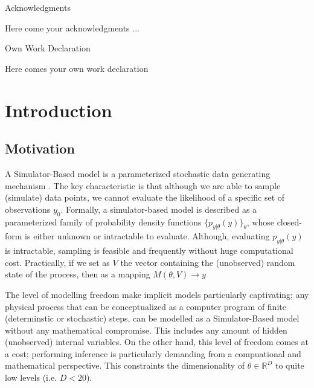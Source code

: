 \documentclass[11pt,twoside]{article}
\numberwithin{Theorem}{section}
\numberwithin{Definition}{section}
\numberwithin{Lemma}{section}
\numberwithin{Algorithm}{section}
\numberwithin{equation}{section}
\begin{document}
\clearpage

\begin{center}
\Large{Acknowledgments}
\end{center}

Here come your acknowledgments ...

\clearpage

\begin{center}
\Large{Own Work Declaration}
\end{center}

Here comes your own work declaration

\cleardoublepage



\pagestyle{plain}
\setcounter{page}{1}

\tableofcontents
\clearpage
\listoftables
\listoffigures
\cleardoublepage

\setcounter{page}{1}

\nocite{*}
% 
\clearpage

\section{Introduction}
\label{sec:introduction}

\subsection{Motivation}

A Simulator-Based model is a parameterized stochastic data generating mechanism \cite{Gutmann2016}. The key characteristic is that although we are able to sample (simulate) data points, we cannot evaluate the likelihood of a specific set of observations $y_0$. Formally, a simulator-based model is described as a parameterized family of probability density functions $\{p_{y|\theta}(y)\}_\theta$, whose closed-form is either unknown or intractable to evaluate. Although, evaluating $p_{y|\theta}(y)$ is intractable, sampling is feasible and frequently without huge computational cost. Practically, if we set as $V$ the vector containing the (unobserved) random state of the process, then as a mapping $M(\theta, V) \rightarrow y$

The level of modelling freedom make implicit models particularly captivating; any physical process that can be conceptualized as a computer program of finite (determinstic or stochastic) steps, can be modelled as a Simulator-Based model without any mathematical compromise. This includes any amount of hidden (unobserved) internal variables. On the other hand, this level of freedom comes at a cost; performing inference is particularly demanding from a compuational and mathematical perspective. This constraints the dimensionality of $\theta \in \mathbb{R}^D$ to quite low levels (i.e. $D<20$).
\end{document}
